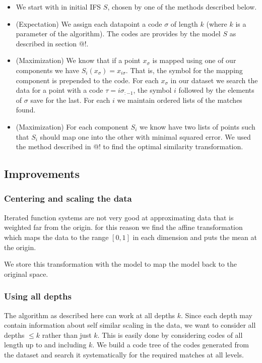 \documentclass[11pt, twocolumn]{article}
\theoremstyle{definition}
\begin{document}
\begin{itemize}
\item We start with in initial IFS $S$, chosen by one of the methods described below. 
\item (Expectation) We assign each datapoint a code $\sigma$ of length $k$ (where $k$ is a parameter of the algorithm). The codes are provides by the model $S$ as described in section @!.
\item (Maximization) We know that if a point $x_\sigma$ is mapped using one of our components we have $S_i(x_\sigma) = x_{i\sigma}$. That is, the symbol for the mapping component is prepended to the code. For each $x_\sigma$ in our dataset we search the data for a point with a code $\tau = i\sigma_{:-1}$, the symbol $i$ followed by the elements of $\sigma$ save for the last. For each $i$ we maintain ordered lists of the matches found.
\item (Maximization) For each component $S_i$ we know have two lists of points such that $S_i$ should map one into the other with minimal squared error. We used the method described in @! to find the optimal similarity transformation. 
\end{itemize}
 
\subsection{Improvements}

\subsubsection{Centering and scaling the data}

Iterated function systems are not very good at approximating data that is weighted far from the origin. for this reason we find the affine transformation which maps the data to the range $[0,1]$ in each dimension and puts the mean at the origin.

We store this transformation with the model to map the model back to the original space.

\subsubsection{Using all depths}

The algorithm as described here can work at all depths $k$. Since each depth may contain information about self similar scaling in the data, we want to consider all depths $\leq k$ rather than just $k$. This is easily done by considering codes of all length up to and including $k$. We build a code tree of the codes generated from the dataset and search it systematically for the required matches at all levels.
\end{document}
